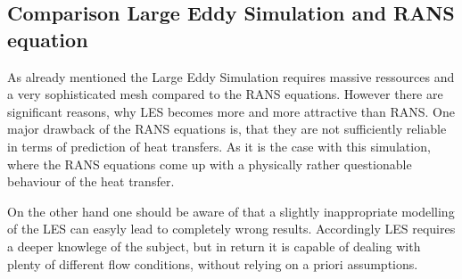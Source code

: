 \subsection{Comparison Large Eddy Simulation and RANS equation}
\label{ss:comparison}
As already mentioned the Large Eddy Simulation requires massive ressources and a very sophisticated mesh compared to the RANS equations. However there are significant reasons, why LES becomes more and more attractive than RANS. One major drawback of the RANS equations is, that they are not sufficiently reliable in terms of prediction of heat transfers. As it is the case with this simulation, where the RANS equations come up with a physically rather questionable behaviour of the heat transfer.

On the other hand one should be aware of that a slightly inappropriate modelling of the LES can easyly lead to completely wrong results. Accordingly LES requires a deeper knowlege of the subject, but in return it is capable of dealing with plenty of different flow conditions, without relying on a priori assumptions.

